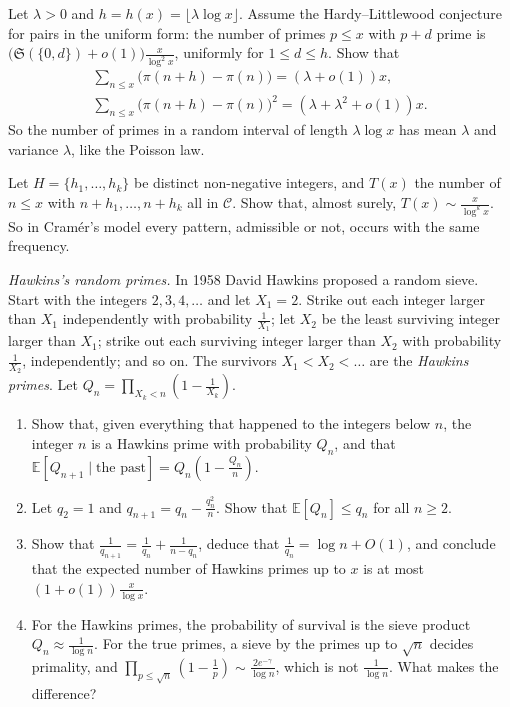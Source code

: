 \begin{exercise}\label{ex:pairsvariance}
Let $\lambda>0$ and $h=h(x)=\lfloor\lambda\log x\rfloor$. Assume the Hardy--Littlewood conjecture for pairs in the uniform form: the number of primes $p\le x$ with $p+d$ prime is
$\bigl(\mathfrak S(\{0,d\})+o(1)\bigr)\frac x{\log^2x}$, uniformly for $1\le d\le h$. Show that
\[
\begin{gathered}\sum_{n\le x}\bigl(\pi(n+h)-\pi(n)\bigr)=(\lambda+o(1))x,\\\sum_{n\le x}\bigl(\pi(n+h)-\pi(n)\bigr)^2=(\lambda+\lambda^2+o(1))x.\end{gathered}
\]
So the number of primes in a random interval of length $\lambda\log x$ has mean $\lambda$ and variance $\lambda$, like the Poisson law.
\end{exercise}

\begin{exercise}[$\star\star\star$]\label{ex:modeltuples}
Let $H=\{h_1,\dots,h_k\}$ be distinct non-negative integers, and $T(x)$ the number of $n\le x$ with $n+h_1,\dots,n+h_k$ all in $\mathcal C$. Show that, almost surely, $T(x)\sim\frac x{\log^kx}$. So in Cramér's
model every pattern, admissible or not, occurs with the same frequency.
\end{exercise}

\begin{exercise}[$\star\star$]\label{pb:hawkins}
\emph{Hawkins's random primes.} In 1958 David Hawkins proposed a random sieve. Start with the integers $2,3,4,\dots$ and let $X_1=2$. Strike out each integer larger than $X_1$
independently with probability $\frac1{X_1}$; let $X_2$ be the least surviving integer larger than $X_1$; strike out each surviving integer larger than $X_2$ with
probability $\frac1{X_2}$, independently; and so on. The survivors $X_1<X_2<\dots$ are the \emph{Hawkins primes}. Let $Q_n=\prod_{X_k<n}(1-\frac1{X_k})$.
\begin{enumerate}[label=(\alph*)]
\item Show that, given everything that happened to the integers below $n$, the integer $n$ is a Hawkins prime with probability $Q_n$, and that
$\mathbb E[Q_{n+1}\mid\text{the past}]=Q_n(1-\frac{Q_n}n)$.
\item Let $q_2=1$ and $q_{n+1}=q_n-\frac{q_n^2}n$. Show that $\mathbb E[Q_n]\le q_n$ for all $n\ge2$.
\item Show that $\frac1{q_{n+1}}=\frac1{q_n}+\frac1{n-q_n}$, deduce that $\frac1{q_n}=\log n+O(1)$, and conclude that the expected number of Hawkins primes up to $x$ is at most
$(1+o(1))\frac x{\log x}$.
\item For the Hawkins primes, the probability of survival is the sieve product $Q_n\approx\frac1{\log n}$. For the true primes, a sieve by the primes up to $\sqrt n$
decides primality, and $\prod_{p\le\sqrt n}(1-\frac1p)\sim\frac{2e^{-\gamma}}{\log n}$, which is not $\frac1{\log n}$. What makes the difference?
\end{enumerate}
\end{exercise}

